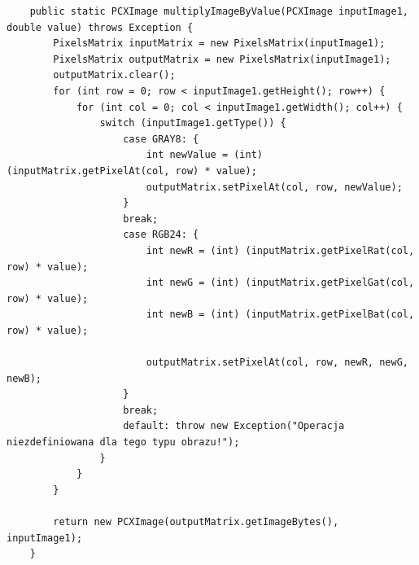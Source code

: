 \documentclass{article}
\begin{document}
	\begin{verbatim}
	public static PCXImage multiplyImageByValue(PCXImage inputImage1, double value) throws Exception {
        PixelsMatrix inputMatrix = new PixelsMatrix(inputImage1);
        PixelsMatrix outputMatrix = new PixelsMatrix(inputImage1);
        outputMatrix.clear();
        for (int row = 0; row < inputImage1.getHeight(); row++) {
            for (int col = 0; col < inputImage1.getWidth(); col++) {
                switch (inputImage1.getType()) {
                    case GRAY8: {
                        int newValue = (int) (inputMatrix.getPixelAt(col, row) * value);
                        outputMatrix.setPixelAt(col, row, newValue);
                    }
                    break;
                    case RGB24: {
                        int newR = (int) (inputMatrix.getPixelRat(col, row) * value);
                        int newG = (int) (inputMatrix.getPixelGat(col, row) * value);
                        int newB = (int) (inputMatrix.getPixelBat(col, row) * value);

                        outputMatrix.setPixelAt(col, row, newR, newG, newB);
                    }
                    break;
                    default: throw new Exception("Operacja niezdefiniowana dla tego typu obrazu!");
                }
            }
        }

        return new PCXImage(outputMatrix.getImageBytes(), inputImage1);
    }
	\end{verbatim}
	
\end{document}
